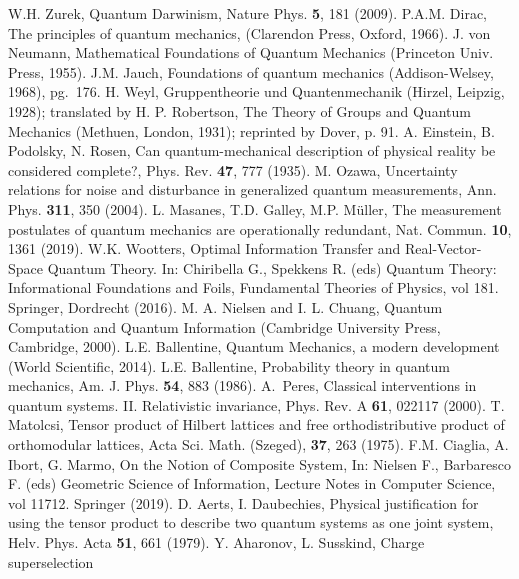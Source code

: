 \documentclass[aps,prl,amsmath,amssymb,twocolumn]{revtex4}
\theoremstyle{plain}
\theoremstyle{definition}
\theoremstyle{remark}
\begin{document}
	\begin{references}
		 W.H. Zurek, Quantum Darwinism, Nature Phys. {\bf 5},
		181 (2009).
		P.A.M. Dirac, The principles of quantum mechanics,
		(Clarendon Press, Oxford, 1966).
		J. von Neumann, Mathematical Foundations of
		Quantum Mechanics (Princeton Univ.  Press, 1955).
		J.M. Jauch, Foundations of quantum mechanics
		(Addison-Welsey, 1968), pg.~176.
		 H. Weyl, Gruppentheorie und Quantenmechanik (Hirzel,
		Leipzig, 1928); translated by H. P. Robertson, The Theory of Groups
		and Quantum Mechanics (Methuen, London, 1931); reprinted by Dover,
		p. 91.
		A. Einstein, B. Podolsky, N. Rosen, Can
		quantum-mechanical description of physical reality be considered
		complete?, Phys. Rev. {\bf 47}, 777 (1935).
		M. Ozawa, {Uncertainty relations for noise and
			disturbance in generalized quantum measurements}, Ann. Phys.  {\bf
			311}, 350 (2004).
		L. Masanes, T.D. Galley, M.P. M\" uller, The
		measurement postulates of quantum mechanics are operationally
		redundant, Nat. Commun. {\bf 10}, 1361 (2019).
		W.K. Wootters, Optimal Information Transfer and
		Real-Vector-Space Quantum Theory. In: Chiribella G., Spekkens R.
		(eds) Quantum Theory: Informational Foundations and Foils,
		Fundamental Theories of Physics, vol 181. Springer, Dordrecht
		(2016).
		M. A. Nielsen and I. L. Chuang, Quantum
		Computation and Quantum Information (Cambridge University Press,
		Cambridge, 2000).
		L.E. Ballentine, Quantum Mechanics, a modern
		development (World Scientific, 2014).
		L.E. Ballentine, Probability theory in
		quantum mechanics, Am. J. Phys. {\bf 54}, 883 (1986).
		A.~Peres, Classical interventions in quantum systems.
		II. Relativistic invariance, Phys. Rev. A {\bf 61}, 022117 (2000).
		 T. Matolcsi, Tensor product of Hilbert lattices and
		free orthodistributive product of orthomodular lattices, Acta Sci.
		Math. (Szeged), {\bf 37}, 263 (1975).
		 F.M. Ciaglia, A. Ibort, G. Marmo, On the Notion of
		Composite System, In: Nielsen F., Barbaresco F. (eds) Geometric
		Science of Information, Lecture Notes in Computer Science, vol
		11712. Springer (2019).
		 D. Aerts, I. Daubechies, Physical justification for
		using the tensor product to describe two quantum systems as one
		joint system, Helv. Phys. Acta {\bf 51}, 661 (1979).
		Y. Aharonov, L. Susskind, Charge superselection

\end{references}
\end{document}
